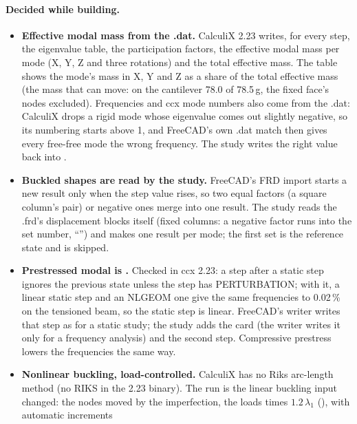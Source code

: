 \paragraph{Decided while building.}
\begin{itemize}[nosep]
  \item \textbf{Effective modal mass from the .dat.} CalculiX 2.23 writes, for every  step, the
        eigenvalue table, the participation factors, the effective modal mass per mode (X, Y, Z and three
        rotations) and the total effective mass. The table shows the mode's mass in X, Y and Z as a share of the
        total effective mass (the mass that can move: on the cantilever 78.0 of 78.5\,g, the fixed face's nodes
        excluded). Frequencies and ccx mode numbers also come from the .dat: CalculiX drops a rigid mode whose
        eigenvalue comes out slightly negative, so its numbering starts above 1, and FreeCAD's own .dat match
        then gives every free-free mode the wrong frequency. The study writes the right value back into
        .
  \item \textbf{Buckled shapes are read by the study.} FreeCAD's FRD import starts a new result only when the step
        value rises, so two equal factors (a square column's pair) or negative ones merge into one result. The
        study reads the .frd's displacement blocks itself (fixed columns: a negative factor runs into the set
        number, ``'') and makes one result per mode; the first set is the reference state
        and is skipped.
  \item \textbf{Prestressed modal is .} Checked in ccx 2.23: a  step after
        a static step ignores the previous state unless the step has PERTURBATION; with it, a linear static step
        and an NLGEOM one give the same frequencies to 0.02\,\% on the tensioned beam, so the static step is
        linear. FreeCAD's writer writes that step as for a static study; the study adds the  card (the
        writer writes it only for a frequency analysis) and the second step. Compressive prestress lowers the
        frequencies the same way.
  \item \textbf{Nonlinear buckling, load-controlled.} CalculiX has no Riks arc-length method (no RIKS in the 2.23
        binary). The run is the linear buckling input changed: the nodes moved by the imperfection, the loads
        times $1.2\,\lambda_1$ (),  with automatic  increments

\end{itemize}
